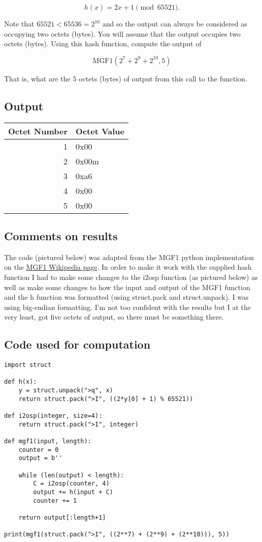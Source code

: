 \documentclass[12pt, letterpaper]{article}
\begin{document}
\[ h(x) = 2x + 1  \pmod {65521}. \] 

Note that $65521 < 65536 = 2^{16}$ and so the output can always be considered as occupying two octets (bytes). You will assume that the output occupies two octets (bytes). Using this hash function, compute the output of 

\[  \textrm{MGF1}(2^7+2^9+2^{10}, 5) \]

That is, what are the 5 octets (bytes) of output from this call to the function. 

\subsection{Output}
\begin{center}
	\begin{tabular}{|r|l|}
		\hline
		\textbf{Octet Number}	&\textbf{Octet Value} 	\\ \hline
		1	&0x00	\\
		2	&0x00m	\\
		3	&0xa6	\\
		4	&0x00	\\
		5	&0x00	\\
		\hline
	\end{tabular}
\end{center}

\subsection{Comments on results}

The code (pictured below) was adapted from the MGF1 python implementation on the \href{https://en.wikipedia.org/wiki/Mask\_generation\_function\#Example\_Code}{MGF1 Wikipedia page}. In order to make it work with the supplied hash function I had to make some changes to the i2osp function (as pictured below) as well as make some changes to how the input and output of the MGF1 function and the h function was formatted (using struct.pack and struct.unpack). I was using big-endian formatting. I'm not too confident with the results but I at the very least, got five octets of output, so there must be something there.

\newpage
\subsection{Code used for computation}
\begin{lstlisting}
import struct

def h(x):
    y = struct.unpack(">q", x)
    return struct.pack(">I", ((2*y[0] + 1) % 65521))

def i2osp(integer, size=4):
    return struct.pack(">I", integer)

def mgf1(input, length):
    counter = 0
    output = b''
    
    while (len(output) < length):
        C = i2osp(counter, 4)
        output += h(input + C)
        counter += 1
  
    return output[:length+1]
    
print(mgf1(struct.pack(">I", ((2**7) + (2**9) + (2**10))), 5))
\end{lstlisting}
\end{document}
